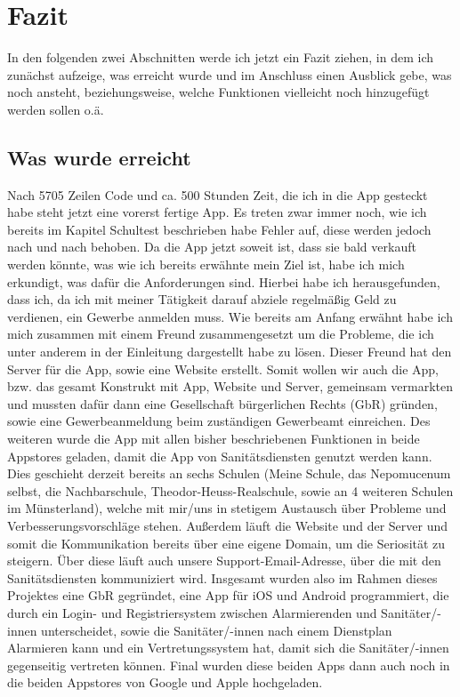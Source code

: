 \section{Fazit}
In den folgenden zwei Abschnitten werde ich jetzt ein Fazit ziehen, in dem ich zunächst aufzeige, was erreicht wurde und 
im Anschluss einen Ausblick gebe, was noch ansteht, beziehungsweise, welche Funktionen vielleicht noch hinzugefügt werden sollen o.ä.
\subsection{Was wurde erreicht}
    Nach 5705 Zeilen Code und ca. 500 Stunden Zeit, die ich in die App gesteckt habe steht jetzt eine vorerst fertige App.
    Es treten zwar immer noch, wie ich bereits im Kapitel Schultest beschrieben habe Fehler auf, diese werden
    jedoch nach und nach behoben. Da die App jetzt soweit ist, dass sie bald verkauft werden könnte, was wie ich
    bereits erwähnte mein Ziel ist, habe ich mich erkundigt, was dafür die Anforderungen sind. Hierbei habe ich herausgefunden, 
    dass ich, da ich mit meiner Tätigkeit darauf abziele regelmäßig Geld zu verdienen, ein Gewerbe anmelden muss.
    Wie bereits am Anfang erwähnt habe ich mich zusammen mit einem Freund zusammengesetzt um die Probleme, die ich unter anderem 
    in der Einleitung dargestellt habe zu lösen. Dieser Freund hat den Server für die App, sowie eine Website erstellt.
    Somit wollen wir auch die App, bzw. das gesamt Konstrukt mit App, Website und Server, gemeinsam vermarkten und mussten
    dafür dann eine Gesellschaft bürgerlichen Rechts (GbR) gründen, sowie eine Gewerbeanmeldung beim zuständigen Gewerbeamt einreichen.
    Des weiteren wurde die App mit allen bisher beschriebenen Funktionen in beide Appstores geladen, damit die App von Sanitätsdiensten 
    genutzt werden kann. Dies geschieht derzeit bereits an sechs Schulen (Meine Schule, das Nepomucenum selbst, die Nachbarschule, 
    Theodor-Heuss-Realschule, sowie an 4 weiteren Schulen im Münsterland), welche mit mir/uns in stetigem Austausch über Probleme und 
    Verbesserungsvorschläge stehen. Außerdem läuft die Website und der Server und somit die Kommunikation bereits über eine eigene Domain,
    um die Seriosität zu steigern. Über diese läuft auch unsere Support-Email-Adresse, über die mit den Sanitätsdiensten kommuniziert
    wird. Insgesamt wurden also im Rahmen dieses Projektes eine GbR gegründet, eine App für iOS und Android programmiert, die durch ein 
    Login- und Registriersystem zwischen Alarmierenden und Sanitäter/-innen unterscheidet, sowie
    die Sanitäter/-innen nach einem Dienstplan Alarmieren kann und ein Vertretungssystem hat, damit sich die Sanitäter/-innen 
    gegenseitig vertreten können. Final wurden diese beiden Apps dann auch noch in die beiden Appstores von Google und Apple hochgeladen.
